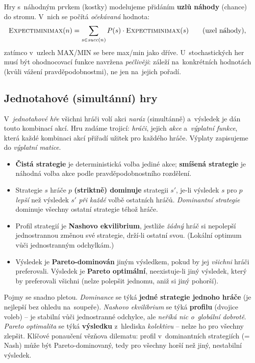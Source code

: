 \begin{poznamka}
Hry s~náhodným prvkem (kostky) modelujeme přidáním \textbf{uzlů náhody} (chance) do stromu. V~nich se počítá \emph{očekávaná} hodnota:
\[
\textsc{Expectiminimax}(n)=\sum_{s\in\mathit{succ}(n)} P(s)\cdot \textsc{Expectiminimax}(s)\qquad(\text{uzel náhody}),
\]
zatímco v~uzlech MAX/MIN se bere max/min jako dříve. U~stochastických her musí být ohodnocovací funkce navržena \emph{pečlivěji}: záleží na~konkrétních hodnotách (kvůli vážení pravděpodobnostmi), ne jen na~jejich pořadí.
\end{poznamka}

\subsection{Jednotahové (simultánní) hry}

V~\emph{jednotahové hře} všichni hráči volí akci \emph{naráz} (simultánně) a~výsledek je dán touto kombinací akcí. Hru zadáme trojicí: \emph{hráči}, jejich \emph{akce} a~\emph{výplatní funkce}, která každé kombinaci akcí přiřadí užitek pro každého hráče. Výplaty zapisujeme do \emph{výplatní matice}.

\begin{definice}
\begin{itemize}
  \item \textbf{Čistá strategie} je deterministická volba jediné akce; \textbf{smíšená strategie} je náhodná volba akce podle pravděpodobnostního rozdělení.
  \item Strategie $s$ hráče $p$ \textbf{(striktně) dominuje} strategii $s'$, je-li výsledek $s$ pro $p$ \emph{lepší} než výsledek $s'$ \emph{při každé} volbě ostatních hráčů. \emph{Dominantní strategie} dominuje všechny ostatní strategie téhož hráče.
  \item Profil strategií je \textbf{Nashovo ekvilibrium}, jestliže \emph{žádný} hráč si nepolepší jednostrannou změnou své strategie, drží-li ostatní svou. (Lokální optimum vůči jednostranným odchylkám.)
  \item Výsledek je \textbf{Pareto-dominován} jiným výsledkem, pokud by jej \emph{všichni} hráči preferovali. Výsledek je \textbf{Pareto optimální}, neexistuje-li jiný výsledek, který by preferovali všichni (nelze polepšit jednomu, aniž si jiný pohorší).
\end{itemize}
\end{definice}

\begin{intuice}
Pojmy se snadno pletou. \emph{Dominance} se týká \textbf{jedné strategie jednoho hráče} (je nejlepší bez ohledu na~soupeře). \emph{Nashovo ekvilibrium} se týká \textbf{profilu} (dvojice voleb) -- je stabilní vůči jednostranné odchylce, ale \emph{neříká nic o~globální dobrotě}. \emph{Pareto optimalita} se týká \textbf{výsledku} z~hlediska \emph{kolektivu} -- nelze ho pro všechny zlepšit. Klíčové ponaučení vězňova dilematu: profil v~dominantních strategiích (= Nash) může být Pareto-dominovaný, tedy pro všechny horší než jiný, nestabilní výsledek.
\end{intuice}

